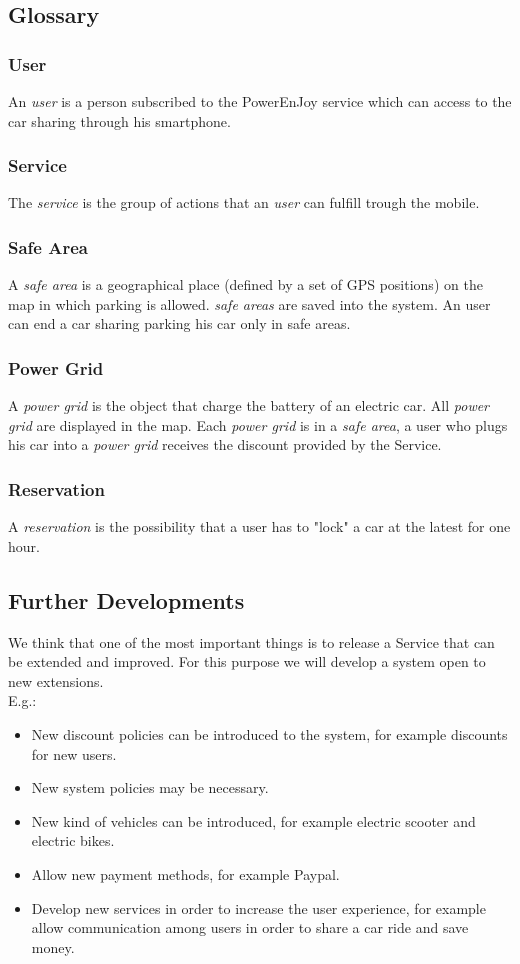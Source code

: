 \documentclass[english]{article}
\begin{document}
	\subsection{Glossary}
		\subsubsection{User}
		An \textit{user} is a person subscribed to the PowerEnJoy service which can access to the car sharing through his smartphone.
	\subsubsection{Service}
		The \textit{service} is the group of actions that an \textit{user} can fulfill trough the mobile.
	\subsubsection {Safe Area}
		A \textit{safe area} is a  geographical place (defined by a set of GPS positions) on the map in which parking is allowed. \textit{safe areas} are saved into the system. An user can end a car sharing parking his car only in safe areas.
	\subsubsection{Power Grid}
		A \textit{power grid} is the object that charge the battery of an electric car. All \textit{power grid} are displayed in the	map. Each \textit{power grid} is in a \textit{safe area}, a user who plugs his car into a \textit{power grid} receives the 				discount provided by the Service.
	\subsubsection{Reservation}
		A \textit{reservation} is the possibility that a user has to "lock" a car at the latest for one hour.
	\subsection{Further Developments }
	We think that one of the most important things is to release a Service that can be extended and improved.
	For this purpose we will develop a system open to new extensions. \\
	E.g.:
	\begin{itemize}
		\item New discount policies can be introduced to the system, for example discounts for new users. 
		\item New system policies may be necessary.
		\item New kind of vehicles can be introduced, for example electric scooter and electric bikes.
		\item Allow new payment methods, for example Paypal\textregistered.
		\item Develop new services in order to increase the user experience, for example  allow communication among users in order to share a car ride and save money.
	\end{itemize}
\end{document}
